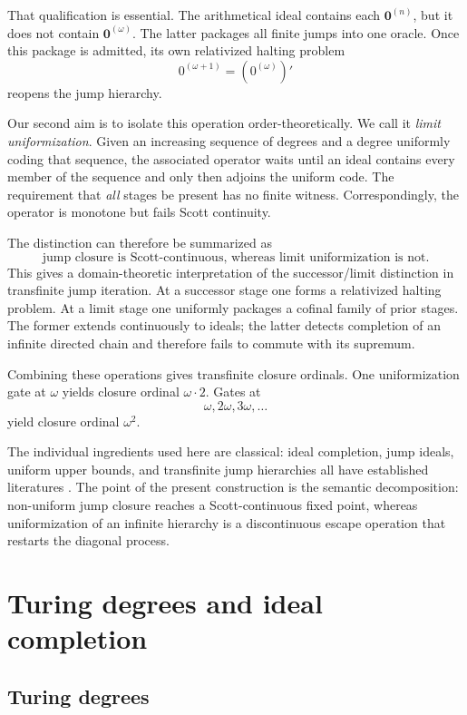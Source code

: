 \documentclass[11pt]{article}
\theoremstyle{definition}
\theoremstyle{remark}
\begin{document}
That qualification is essential. The arithmetical ideal contains each $\mathbf0^{(n)}$, but it does not contain $\mathbf0^{(\omega)}$. The latter packages all finite jumps into one oracle. Once this package is admitted, its own relativized halting problem
\[
0^{(\omega+1)}=(0^{(\omega)})'
\]
reopens the jump hierarchy.

Our second aim is to isolate this operation order-theoretically. We call it \emph{limit uniformization}. Given an increasing sequence of degrees and a degree uniformly coding that sequence, the associated operator waits until an ideal contains every member of the sequence and only then adjoins the uniform code. The requirement that \emph{all} stages be present has no finite witness. Correspondingly, the operator is monotone but fails Scott continuity.

The distinction can therefore be summarized as
\[
\boxed{\text{jump closure is Scott-continuous, whereas limit uniformization is not.}}
\]
This gives a domain-theoretic interpretation of the successor/limit distinction in transfinite jump iteration. At a successor stage one forms a relativized halting problem. At a limit stage one uniformly packages a cofinal family of prior stages. The former extends continuously to ideals; the latter detects completion of an infinite directed chain and therefore fails to commute with its supremum.

Combining these operations gives transfinite closure ordinals. One uniformization gate at $\omega$ yields closure ordinal $\omega\cdot2$. Gates at
\[
\omega,2\omega,3\omega,\ldots
\]
yield closure ordinal $\omega^2$.

The individual ingredients used here are classical: ideal completion, jump ideals, uniform upper bounds, and transfinite jump hierarchies all have established literatures \cite{Hodes1982,Slaman2005}. The point of the present construction is the semantic decomposition: non-uniform jump closure reaches a Scott-continuous fixed point, whereas uniformization of an infinite hierarchy is a discontinuous escape operation that restarts the diagonal process.

\section{Turing degrees and ideal completion}

\subsection{Turing degrees}
\end{document}
